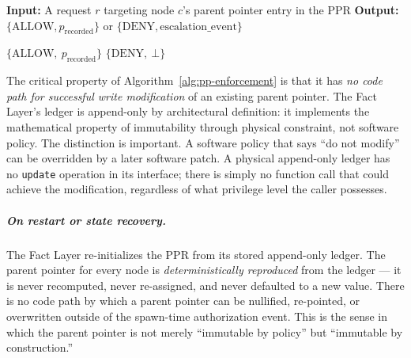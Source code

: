 \begin{algorithm}[htbp]
\caption{Parent Pointer Immutability Enforcement (Fact Layer)}
\label{alg:pp-enforcement}
\begin{algorithmic}
\Statex \textbf{Input:} A request $r$ targeting node $c$'s parent pointer entry in the PPR
\Statex \textbf{Output:} $\{\text{ALLOW}, p_{\text{recorded}}\}$ or $\{\text{DENY}, \text{escalation\_event}\}$

  \Statex

    \State \Return $\{\text{ALLOW},\ p_{\text{recorded}}\}$
    \State {}
    \State {}
    \State {}
    \State \Return $\{\text{DENY},\ \bot\}$
  \EndIf
\EndFunction
\end{algorithmic}
\end{algorithm}

The critical property of Algorithm~\ref{alg:pp-enforcement} is that it has \textit{no code path for successful write modification} of an existing parent pointer. The Fact Layer's ledger is append-only by architectural definition: it implements the mathematical property of immutability through physical constraint, not software policy. The distinction is important. A software policy that says ``do not modify'' can be overridden by a later software patch. A physical append-only ledger has no \texttt{update} operation in its interface; there is simply no function call that could achieve the modification, regardless of what privilege level the caller possesses.

\subparagraph{On restart or state recovery.}
The Fact Layer re-initializes the PPR from its stored append-only ledger. The parent pointer for every node is \textit{deterministically reproduced} from the ledger --- it is never recomputed, never re-assigned, and never defaulted to a new value. There is no code path by which a parent pointer can be nullified, re-pointed, or overwritten outside of the spawn-time authorization event. This is the sense in which the parent pointer is not merely ``immutable by policy'' but ``immutable by construction.''

